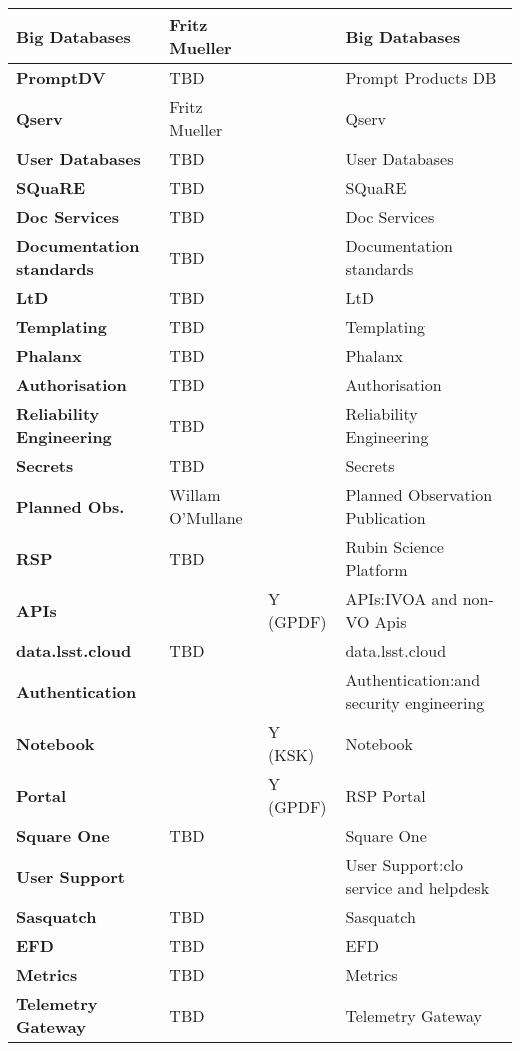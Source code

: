 \begin{longtable} {
|p{}   |p{}|p{} |p{}|}
{\textbf{Big Databases}} & Fritz Mueller &  & Big Databases \\ \hline
{\textbf{PromptDV}} & TBD &  & Prompt Products DB \\ \hline
{\textbf{Qserv}} & Fritz Mueller &  & Qserv \\ \hline
{\textbf{User Databases}} & TBD &  & User Databases \\ \hline
{\textbf{SQuaRE}} & TBD &  & SQuaRE \\ \hline
{\textbf{Doc Services}} & TBD &  & Doc Services \\ \hline
{\textbf{Documentation standards}} & TBD &  & Documentation standards \\ \hline
{\textbf{LtD}} & TBD &  & LtD \\ \hline
{\textbf{Templating}} & TBD &  & Templating \\ \hline
{\textbf{Phalanx}} & TBD &  & Phalanx \\ \hline
{\textbf{Authorisation}} & TBD &  & Authorisation \\ \hline
{\textbf{Reliability Engineering}} & TBD &  & Reliability Engineering \\ \hline
{\textbf{Secrets}} & TBD &  & Secrets \\ \hline
{\textbf{Planned Obs.}} & Willam O'Mullane &  & Planned Observation Publication \\ \hline
{\textbf{RSP}} & TBD &  & Rubin Science Platform \\ \hline
{\textbf{APIs}} &  & Y (GPDF) & APIs:IVOA and non-VO Apis \\ \hline
{\textbf{data.lsst.cloud}} & TBD &  & data.lsst.cloud \\ \hline
{\textbf{Authentication}} &  &  & Authentication:and security engineering \\ \hline
{\textbf{Notebook}} &  & Y (KSK) & Notebook \\ \hline
{\textbf{Portal}} &  & Y (GPDF) & RSP Portal \\ \hline
{\textbf{Square One}} & TBD &  & Square One \\ \hline
{\textbf{User Support}} &  &  & User Support:clo service and helpdesk \\ \hline
{\textbf{Sasquatch}} & TBD &  & Sasquatch \\ \hline
{\textbf{EFD}} & TBD &  & EFD \\ \hline
{\textbf{Metrics}} & TBD &  & Metrics \\ \hline
{\textbf{Telemetry Gateway}} & TBD &  & Telemetry Gateway \\ \hline
\end{longtable}
\normalsize
